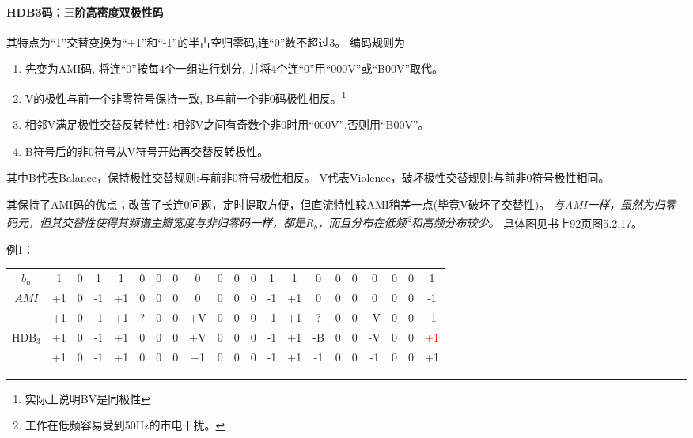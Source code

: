     \paragraph{HDB3码：三阶高密度双极性码}\mbox{}

    其特点为“1”交替变换为“+1”和“-1”的半占空归零码,连“0”数不超过3。
    编码规则为
    \begin{enumerate}[itemsep=0pt,parsep=0em,label=\color{bupt}\arabic*、,labelsep=0pt,leftmargin=4em]
        \item 先变为AMI码, 将连“0”按每4个一组进行划分, 并将4个连“0”用“000V”或“B00V”取代。
        \item V的极性与前一个非零符号保持一致, B与前一个非0码极性相反。\footnote{实际上说明BV是同极性}
        \item 相邻V满足极性交替反转特性: 相邻V之间有奇数个非0时用“000V”,否则用“B00V”。
        \item B符号后的非0符号从V符号开始再交替反转极性。
    \end{enumerate}
    其中B代表Balance，保持极性交替规则:与前非0符号极性相反。
    V代表Violence，破坏极性交替规则:与前非0符号极性相同。
    
    其保持了AMI码的优点；改善了长连0问题，定时提取方便，但直流特性较AMI稍差一点(毕竟V破坏了交替性)。
    \emph{与AMI一样，虽然为归零码元，但其交替性使得其频谱主瓣宽度与非归零码一样，都是$R_b$，而且分布在低频\footnote{工作在低频容易受到50Hz的市电干扰。}和高频分布较少。}
    具体图见书上92页图5.2.17。

    例1：
    \begin{table}[H]
        \centering
        \begin{tabular}{c|*{19}{c}c}
            \textcolor{bupt}{\hspace{-3pt}$b_n$\hspace{-3pt}} &1 &0 &1 &1 &0 &0 &0 &0 &0 &0 &0 &1 &1 &0 &0 &0 &0 &0 &0 &1 \\ \Xhline{0.3pt}
            \textcolor{bupt}{\hspace{-3pt}$AMI$\hspace{-3pt}} &+1 &0 &-1 &+1 &\textcolor{pur}{0} &\textcolor{pur}{0} &\textcolor{pur}{0} &\textcolor{pur}{0} &0 &0 &0 &-1 &+1 &\textcolor{pur}{0} &\textcolor{pur}{0} &\textcolor{pur}{0} &\textcolor{pur}{0} &0 &0 &-1 \\ \Xhline{0.3pt}
            \textcolor{bupt}{} &+1 &0 &-1 &+1 &\textcolor{pur}{?} &\textcolor{pur}{0} &\textcolor{pur}{0} &\textcolor{pur}{+V} &0 &0 &0 &-1 &+1 &\textcolor{pur}{?} &\textcolor{pur}{0} &\textcolor{pur}{0} &\textcolor{pur}{-V} &0 &0 &-1 \\ \Xhline{0.3pt}
            \textcolor{bupt}{\hspace{-3pt}HDB${}_3$\hspace{-3pt}} &+1 &0 &-1 &+1 &\textcolor{pur}{0} &\textcolor{pur}{0} &\textcolor{pur}{0} &\textcolor{pur}{+V} &0 &0 &0 &-1 &+1 &\textcolor{pur}{-B} &\textcolor{pur}{0} &\textcolor{pur}{0} &\textcolor{pur}{-V} &0 &0 &\textcolor{red}{+1} \\\Xhline{0.3pt}
            \textcolor{bupt}{}&+1 &0 &-1 &+1 &0 &0 &0 &+1 &0 &0 &0 &-1 &+1 &-1 &0 &0 &-1 &0 &0 &+1
        \end{tabular}
    \end{table}

